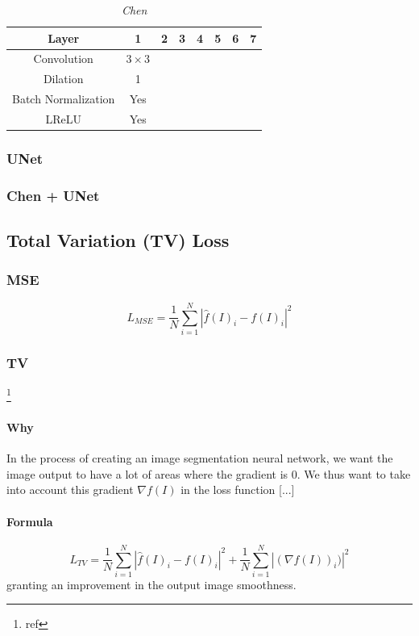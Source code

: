 \documentclass{article}
\begin{document}
            \begin{table}[!ht]
                \centering
                \begin{tabular}{|c|c|c|c|c|c|c|c|}
                    \hline
                    Layer & 1 & 2 & 3 & 4 & 5 & 6 & 7\\
                    \hline \hline
                    Convolution & $3\times3$ & & & & & & \\
                    \hline
                    Dilation & 1 & & & & & & \\
                    \hline
                    Batch Normalization & Yes & & & & & & \\
                    \hline
                    LReLU & Yes & & & & & & \\
                    \hline
                \end{tabular}
                \caption{\textit{Chen}}
            \end{table}

        \subsubsection{UNet}
        \subsubsection{Chen + UNet}

    \subsection{Total Variation (TV) Loss}
        \subsubsection{MSE}
        $$L_{MSE}=\frac{1}{N}\sum_{i=1}^N |\hat{f}(I)_i-f(I)_i|^2$$

        \subsubsection{TV}\footnote{ref}
            \paragraph{Why} In the process of creating an image segmentation neural network, we want the image output to have a lot of areas where the gradient is $0$. We thus want to take into account this gradient $\nabla f(I)$ in the loss function [...]
            \paragraph{Formula}
            $$L_{TV}=\frac{1}{N}\sum_{i=1}^N |\hat{f}(I)_i-f(I)_i|^2+\frac{1}{N}\sum_{i=1}^N|(\nabla f(I))_i)|^2$$
            granting an improvement in the output image smoothness.
\end{document}
